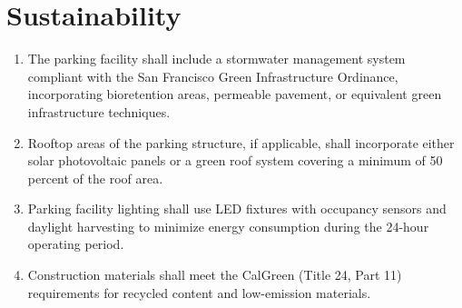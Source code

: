\documentclass[11pt,letterpaper]{article}
\begin{document}
\section{Sustainability}

\begin{enumerate}[label=(\alph*)]
\item The parking facility shall include a stormwater management system
  compliant with the San Francisco Green Infrastructure Ordinance,
  incorporating bioretention areas, permeable pavement, or equivalent
  green infrastructure techniques.

\item Rooftop areas of the parking structure, if applicable, shall incorporate
  either solar photovoltaic panels or a green roof system covering a minimum
  of 50 percent of the roof area.

\item Parking facility lighting shall use LED fixtures with occupancy sensors
  and daylight harvesting to minimize energy consumption during the 24-hour
  operating period.

\item Construction materials shall meet the CalGreen (Title 24, Part 11)
  requirements for recycled content and low-emission materials.
\end{enumerate}

\printbibliography[title={References}]
\end{document}

